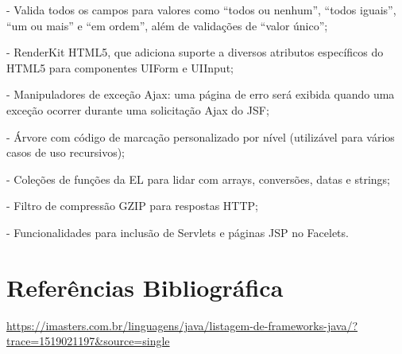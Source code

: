 \documentclass[12pt,a4paper]{article}
\begin{document}
- Valida todos os campos para valores como “todos ou nenhum”, “todos iguais”, “um ou mais” e “em ordem”, além de validações de “valor único”;

- RenderKit HTML5, que adiciona suporte a diversos atributos específicos do HTML5 para componentes UIForm e UIInput;

- Manipuladores de exceção Ajax: uma página de erro será exibida quando uma exceção ocorrer durante uma solicitação Ajax do JSF;

- Árvore com código de marcação personalizado por nível (utilizável para vários casos de uso recursivos);

- Coleções de funções da EL para lidar com arrays, conversões, datas e strings;

- Filtro de compressão GZIP para respostas HTTP;

- Funcionalidades para inclusão de Servlets e páginas JSP no Facelets.

\section{Referências Bibliográfica}
\noindent 
\url {https://imasters.com.br/linguagens/java/listagem-de-frameworks-java/?trace=1519021197&source=single}
\\\vspace{0.2cm}
\end{document}
